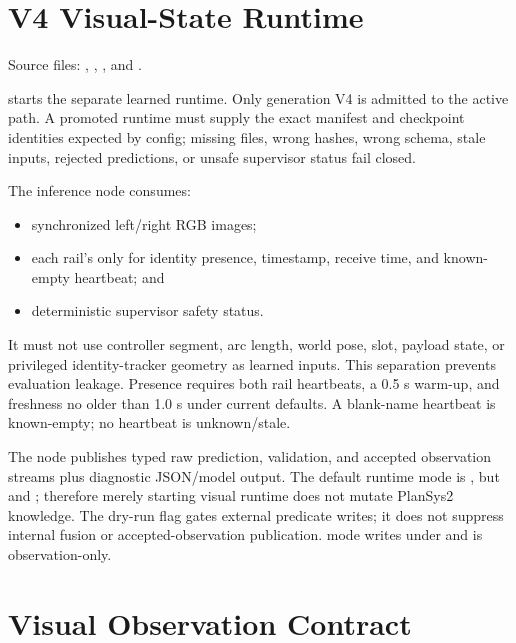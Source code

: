 \section{V4 Visual-State Runtime}

Source files: ,
,
, and
.

 starts the separate learned
runtime. Only generation V4 is admitted to the active path. A promoted runtime
must supply the exact manifest and checkpoint identities expected by config;
missing files, wrong hashes, wrong schema, stale inputs, rejected predictions,
or unsafe supervisor status fail closed.

The inference node consumes:

\begin{itemize}
  \item synchronized left/right RGB images;
  \item each rail's  only for identity presence, timestamp,
        receive time, and known-empty heartbeat; and
  \item deterministic supervisor safety status.
\end{itemize}

It must not use controller segment, arc length, world pose, slot, payload state,
or privileged identity-tracker geometry as learned inputs. This separation
prevents evaluation leakage. Presence requires both rail heartbeats, a 0.5 s
warm-up, and freshness no older than 1.0 s under current defaults. A blank-name
heartbeat is known-empty; no heartbeat is unknown/stale.

The node publishes typed raw prediction, validation, and accepted observation
streams plus diagnostic JSON/model output. The default runtime mode is
, but  and
; therefore merely starting visual runtime
does not mutate PlanSys2 knowledge. The dry-run flag gates external predicate
writes; it does not suppress internal fusion or accepted-observation
publication.  mode writes under
 and is observation-only.

\section{Visual Observation Contract}


